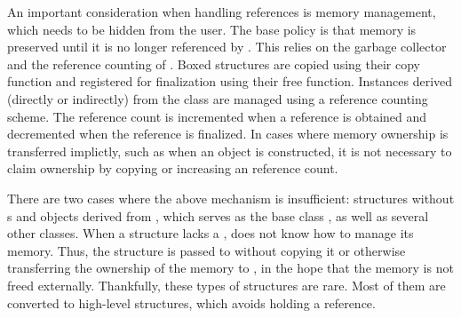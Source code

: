 \documentclass[article,shortnames]{jss}
\begin{document}
An important consideration when handling references is memory
management, which needs to be hidden from the  user. The
base policy is that memory is preserved until it is no longer
referenced by . This relies on the  garbage
collector and the reference counting of . 
Boxed structures are copied using their copy function and
registered for finalization using their free function. Instances
derived (directly or indirectly) from the  class are
managed using a reference counting scheme. The reference count is
incremented when a reference is obtained and decremented when the
reference is finalized.  In cases where memory ownership is
transferred implictly, such as when an object is constructed, it is
not necessary to claim ownership by copying or increasing an reference
count.

There are two cases where the above mechanism is insufficient: 
structures without s and objects derived from
, which serves as the base class , as
well as several other  classes.
When a structure lacks a ,  does not know how
to
manage its memory. 
Thus, the structure is passed to  without copying it or
otherwise
transferring the ownership of the memory to , in the hope
that the
memory is not freed externally. Thankfully, these types of structures
are rare.
Most of them are converted to high-level 
structures, 
which avoids holding a reference. 
\end{document}

